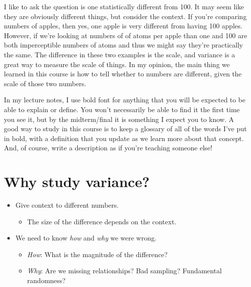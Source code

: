 \documentclass[
  letterpaper,
  DIV=11,
  numbers=noendperiod]{scrreprt}
\providecommand{\tightlist}{%
  \setlength{\itemsep}{0pt}\setlength{\parskip}{0pt}}\usepackage{longtable,booktabs,array}
\begin{document}
I like to ask the question is one statistically different from 100. It
may seem like they are obviously different things, but consider the
context. If you're comparing numbers of apples, then yes, one apple is
very different from having 100 apples. However, if we're looking at
numbers of of atoms per apple than one and 100 are both imperceptible
numbers of atoms and thus we might say they're practically the same. The
difference in these two examples is the scale, and variance is a great
way to measure the scale of things. In my opinion, the main thing we
learned in this course is how to tell whether to numbers are different,
given the scale of those two numbers.

In my lecture notes, I use bold font for anything that you will be
expected to be able to explain or define. You won't necessarily be able
to find it the first time you see it, but by the midterm/final it is
something I expect you to know. A good way to study in this course is to
keep a glossary of all of the words I've put in bold, with a definition
that you update as we learn more about that concept. And, of course,
write a description as if you're teaching someone else!

\hypertarget{why-study-variance}{%
\section{Why study variance?}\label{why-study-variance}}

\begin{itemize}
\tightlist
\item
  Give context to different numbers.

  \begin{itemize}
  \tightlist
  \item
    The size of the difference depends on the context.\lspace
  \end{itemize}
\item
  We need to know \emph{how} and \emph{why} we were wrong.

  \begin{itemize}
  \tightlist
  \item
    \emph{How}: What is the magnitude of the difference?
  \item
    \emph{Why}: Are we missing relationships? Bad sampling? Fundamental
    randomness?
  \end{itemize}
\end{itemize}

\pspace
\end{document}
